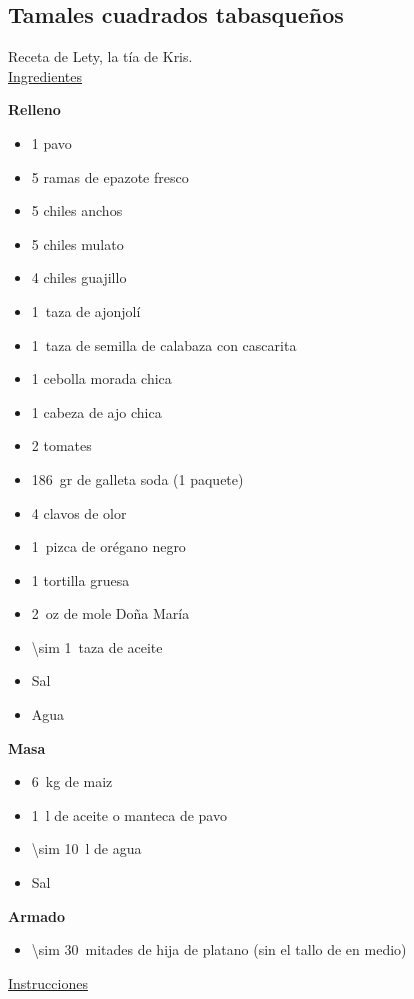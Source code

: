 \subsection{Tamales cuadrados tabasqueños}
\label{sec:tamales-cuadrados}

Receta de Lety, la tía de Kris.\\

\underline{Ingredientes}

\textbf{Relleno}
\begin{itemize}
\item 1 pavo
\item 5 ramas de epazote fresco
\item 5 chiles anchos
\item 5 chiles mulato
\item 4 chiles guajillo
\item \SI{1}{taza} de ajonjolí
\item \SI{1}{taza} de semilla de calabaza con cascarita
\item 1 cebolla morada chica
\item 1 cabeza de ajo chica
\item 2 tomates
\item \SI{186}{gr} de galleta soda (1 paquete)
\item 4 clavos de olor
\item \SI{1}{pizca} de orégano negro
\item 1 tortilla gruesa
\item \SI{2}{oz} de mole Doña María
\item \SI{\sim 1}{taza} de aceite
\item Sal
\item Agua
\end{itemize}

\textbf{Masa}
\begin{itemize}
\item \SI{6}{kg} de maiz
\item \SI{1}{l} de aceite o manteca de pavo
\item \SI{\sim 10}{l} de agua
\item Sal
\end{itemize}

\textbf{Armado}
\begin{itemize}
\item \SI{\sim 30}{mitades} de hija de platano (sin el tallo de en medio)
\end{itemize}

\underline{Instrucciones}

